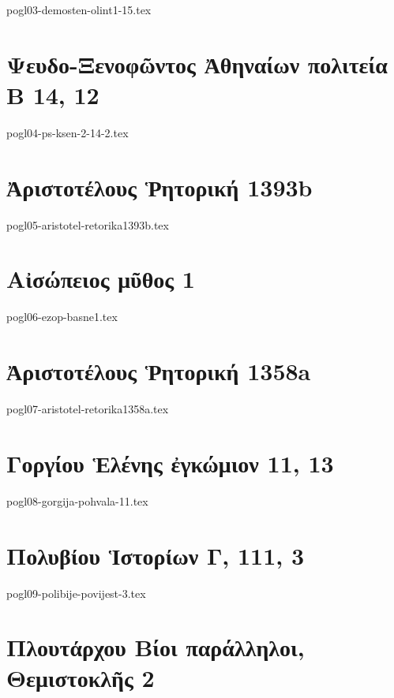 \documentclass[a4paper,12pt,twoside]{report}
\begin{document}
{pogl03-demosten-olint1-15.tex}

\chapter[Ψευδο-Ξενοφῶντος Ἀθηναίων πολιτεία Β]{\textgreek[variant=ancient]{Ψευδο-Ξενοφῶντος Ἀθηναίων πολιτεία \\Β} 14, 12}

{pogl04-ps-ksen-2-14-2.tex}

\chapter[Ἀριστοτέλους Ῥητορική]{\textgreek[variant=ancient]{Ἀριστοτέλους Ῥητορική} 1393b}

{pogl05-aristotel-retorika1393b.tex}

\chapter[Αἰσώπειος μῦθος 1]{\textgreek[variant=ancient]{Αἰσώπειος μῦθος} 1}

{pogl06-ezop-basne1.tex}

\chapter[Ἀριστοτέλους Ῥητορική]{\textgreek[variant=ancient]{Ἀριστοτέλους Ῥητορική} 1358a}

{pogl07-aristotel-retorika1358a.tex}

\chapter[Γοργίου Ἑλένης ἐγκώμιον]{\textgreek[variant=ancient]{Γοργίου Ἑλένης ἐγκώμιον} 11, 13}

{pogl08-gorgija-pohvala-11.tex}

\chapter[Πολυβίου Ἱστορίων Γ]{\textgreek[variant=ancient]{Πολυβίου Ἱστορίων Γ,} 111, 3}

{pogl09-polibije-povijest-3.tex}

\chapter[Πλουτάρχου Θεμιστοκλῆς]{\textgreek[variant=ancient]{Πλουτάρχου Βίοι παράλληλοι, \\Θεμιστοκλῆς} 2}
\end{document}
